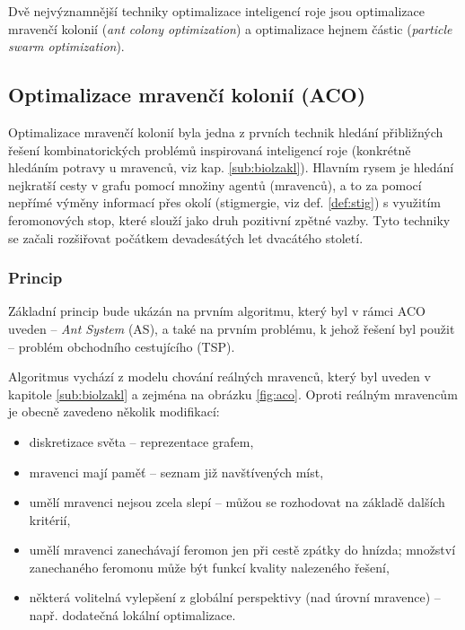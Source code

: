 \documentclass[a4paper,12pt]{article}
\begin{document}
Dvě nejvýznamnější techniky optimalizace inteligencí roje jsou optimalizace mravenčí
kolonií ({\it ant colony optimization}) a optimalizace hejnem částic ({\it particle swarm optimization}).

\subsection{Optimalizace mravenčí kolonií (ACO)}
Optimalizace mravenčí kolonií byla jedna z prvních technik hledání přibližných řešení kombinatorických
problémů inspirovaná inteligencí roje (konkrétně hledáním potravy u mravenců, viz kap. \ref{sub:biolzakl}).
Hlavním rysem je hledání nejkratší cesty v grafu pomocí množiny agentů (mravenců), a to za pomocí nepřímé výměny
informací přes okolí (stigmergie, viz def. \ref{def:stig}) s využitím feromonových stop, které slouží jako druh
pozitivní zpětné vazby. Tyto techniky se začali rozšiřovat počátkem devadesátých let dvacátého století.

\subsubsection{Princip}
Základní princip bude ukázán na prvním algoritmu, který byl v rámci ACO uveden -- {\it Ant System} (AS), a také
na prvním problému, k jehož řešení byl použit -- problém obchodního cestujícího (TSP).

Algoritmus vychází z modelu chování reálných mravenců, který byl uveden v kapitole \ref{sub:biolzakl} a zejména
na obrázku \ref{fig:aco}. Oproti reálným mravencům je obecně zavedeno několik modifikací:
\begin{itemize}
  \item diskretizace světa -- reprezentace grafem, %
  \item mravenci mají paměť -- seznam již navštívených míst,
  \item umělí mravenci nejsou zcela slepí -- můžou se rozhodovat na základě dalších kritérií, %
  \item umělí mravenci zanechávají feromon jen při cestě zpátky do hnízda; množství zanechaného feromonu může
        být funkcí kvality nalezeného řešení, 
  \item některá volitelná vylepšení z globální perspektivy (nad úrovní mravence) -- např. dodatečná lokální optimalizace.
\end{itemize}
\end{document}
